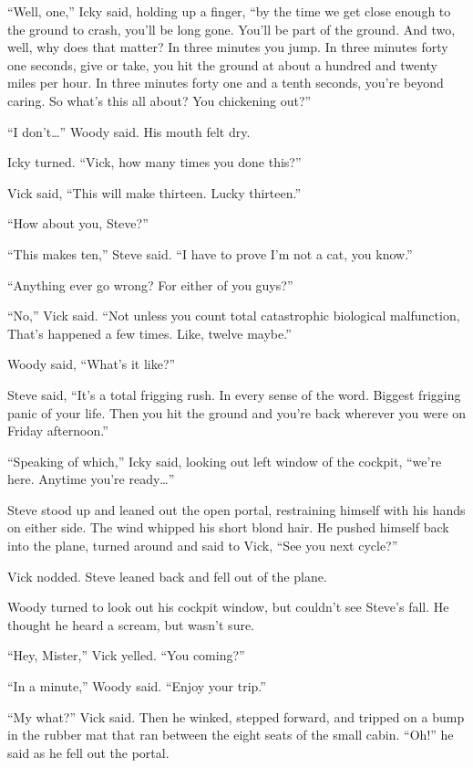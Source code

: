``Well, one,'' Icky said, holding up a finger, ``by the time we get close enough to the ground to crash, you'll be long gone. You'll be part of the ground. And two, well, why does that matter? In three minutes you jump. In three minutes forty one seconds, give or take, you hit the ground at about a hundred and twenty miles per hour. In three minutes forty one and a tenth seconds, you're beyond caring. So what's this all about? You chickening out?''

``I don't…'' Woody said. His mouth felt dry.

Icky turned. ``Vick, how many times you done this?''

Vick said, ``This will make thirteen. Lucky thirteen.''

``How about you, Steve?''

``This makes ten,'' Steve said. ``I have to prove I'm not a cat, you know.''

``Anything ever go wrong? For either of you guys?''

``No,'' Vick said. ``Not unless you count total catastrophic biological malfunction, That's happened a few times. Like, twelve maybe.''

Woody said, ``What's it like?''

Steve said, ``It's a total frigging rush. In every sense of the word. Biggest frigging panic of your life. Then you hit the ground and you're back wherever you were on Friday afternoon.''

``Speaking of which,'' Icky said, looking out left window of the cockpit, ``we're here. Anytime you're ready…''

Steve stood up and leaned out the open portal, restraining himself with his hands on either side. The wind whipped his short blond hair. He pushed himself back into the plane, turned around and said to Vick, ``See you next cycle?''

Vick nodded. Steve leaned back and fell out of the plane.

Woody turned to look out his cockpit window, but couldn't see Steve's fall. He thought he heard a scream, but wasn't sure.

``Hey, Mister,'' Vick yelled. ``You coming?''

``In a minute,'' Woody said. ``Enjoy your trip.''

``My what?'' Vick said. Then he winked, stepped forward, and tripped on a bump in the rubber mat that ran between the eight seats of the small cabin. ``Oh!'' he said as he fell out the portal.

